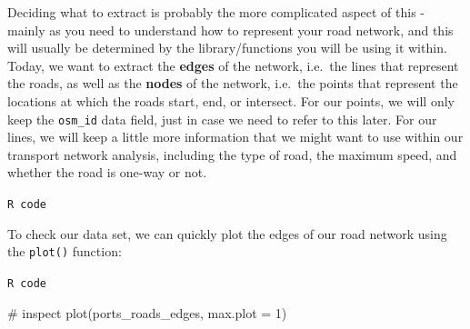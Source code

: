\documentclass[
  letterpaper,
  DIV=11,
  numbers=noendperiod]{scrreprt}
\newenvironment{Shaded}{\begin{snugshade}}{\end{snugshade}}
\newcommand{\AttributeTok}[1]{\textcolor[rgb]{0.40,0.45,0.13}{#1}}
\newcommand{\CommentTok}[1]{\textcolor[rgb]{0.37,0.37,0.37}{#1}}
\newcommand{\DecValTok}[1]{\textcolor[rgb]{0.68,0.00,0.00}{#1}}
\newcommand{\FunctionTok}[1]{\textcolor[rgb]{0.28,0.35,0.67}{#1}}
\newcommand{\NormalTok}[1]{\textcolor[rgb]{0.00,0.23,0.31}{#1}}
\newcommand{\OtherTok}[1]{\textcolor[rgb]{0.00,0.23,0.31}{#1}}
\newcommand{\SpecialCharTok}[1]{\textcolor[rgb]{0.37,0.37,0.37}{#1}}
\newcommand{\StringTok}[1]{\textcolor[rgb]{0.13,0.47,0.30}{#1}}
\begin{document}
Deciding what to extract is probably the more complicated aspect of this
- mainly as you need to understand how to represent your road network,
and this will usually be determined by the library/functions you will be
using it within. Today, we want to extract the \textbf{edges} of the
network, i.e.~the lines that represent the roads, as well as the
\textbf{nodes} of the network, i.e.~the points that represent the
locations at which the roads start, end, or intersect. For our points,
we will only keep the \texttt{osm\_id} data field, just in case we need
to refer to this later. For our lines, we will keep a little more
information that we might want to use within our transport network
analysis, including the type of road, the maximum speed, and whether the
road is one-way or not.

\begin{codelisting}

\caption{\texttt{R code}}

\begin{Shaded}
\end{Shaded}

\end{codelisting}

To check our data set, we can quickly plot the edges of our road network
using the \texttt{plot()} function:

\begin{codelisting}

\caption{\texttt{R code}}

\begin{Shaded}
\begin{Highlighting}[]
\CommentTok{\# inspect}
\FunctionTok{plot}\NormalTok{(ports\_roads\_edges, }\AttributeTok{max.plot =} \DecValTok{1}\NormalTok{)}
\end{Highlighting}
\end{Shaded}

\end{codelisting}
\end{document}

